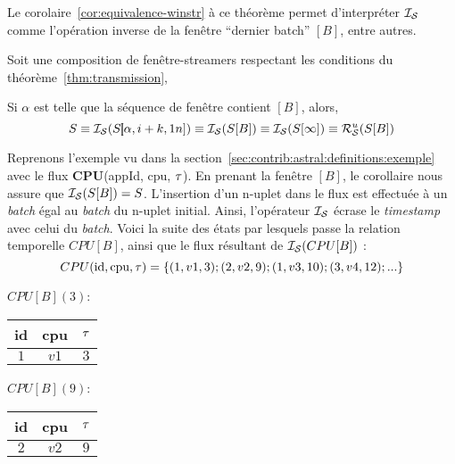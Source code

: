 Le corolaire~\ref{cor:equivalence-winstr} à ce théorème permet d'interpréter $\mathcal{I_S}$ comme l'opération inverse de la fenêtre \enquote{dernier batch} $[B]$, entre autres.
\begin{coro}\label{cor:equivalence-winstr}
    Soit une composition de fenêtre-streamers respectant les conditions du théorème~\ref{thm:transmission},

    Si $\alpha$ est telle que la séquence de fenêtre contient $[B]$, alors,
$$S \equiv \mathcal{I_S}(S]\!\![\alpha,i+k,1n]) \equiv \mathcal{I_S}(S[B]) \equiv \mathcal{I_S}(S[\infty]) \equiv \mathcal{R}_{\mathcal S}^{u}(S[B])$$
\end{coro}

\begin{example}
Reprenons l'exemple vu dans la section~\ref{sec:contrib:astral:definitions:exemple} avec le flux \textbf{CPU}(appId, cpu, $\tau$). En prenant la fenêtre $[B]$, le corollaire nous assure que $\mathcal{I_S}(S[B])=S$. L'insertion d'un n-uplet dans le flux est effectuée à un \textit{batch} égal au \textit{batch} du n-uplet initial. Ainsi, l'opérateur $\mathcal{I_S}$ écrase le \textit{timestamp} avec celui du \textit{batch}. Voici la suite des états par lesquels passe la relation temporelle $CPU[B]$, ainsi que le flux résultant de $\mathcal{I_S}(CPU[B])$ :
$$CPU(\textrm{id},\textrm{cpu},\tau)=\{(1,v1,3);(2,v2,9);(1,v3,10);(3,v4,12);...\}$$
\noindent\begin{minipage}[c]{0.24\linewidth}
\begin{center}$CPU[B](3)$: \\ \vspace{1em}
\begin{tabular}{|c|c|c|}
\hline
id & cpu & $\tau$ \\
\hline
$1$ & $v1$ & $3$ \\
\hline
\end{tabular}\end{center}
\end{minipage} %
\begin{minipage}[c]{0.24\linewidth}
\begin{center}$CPU[B](9)$: \\ \vspace{1em}
\begin{tabular}{|c|c|c|}
\hline
id & cpu & $\tau$ \\
\hline
$2$ & $v2$ & $9$ \\
\hline
\end{tabular}\end{center}
\end{minipage} %

\end{example}

